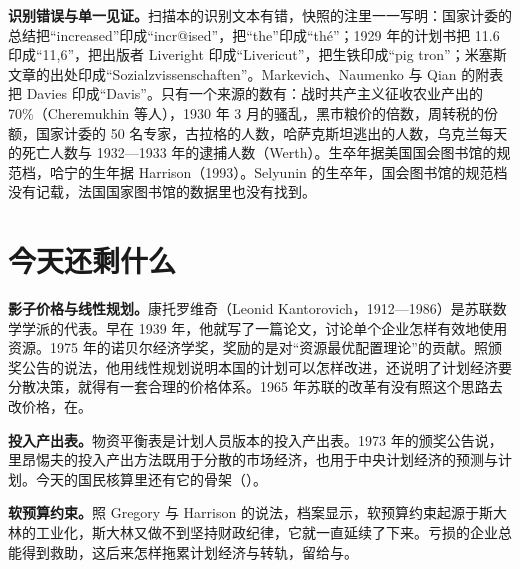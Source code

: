 \begin{deeper}[史料说明]
\textbf{识别错误与单一见证。}扫描本的识别文本有错，快照的注里一一写明：国家计委的总结把“increased”印成“incr@ised”，把“the”印成“thé”；1929 年的计划书把 11.6 印成“11,6”，把出版者 Liveright 印成“Livericut”，把生铁印成“pig tron”；米塞斯文章的出处印成“Sozialzvissenschaften”。Markevich、Naumenko 与 Qian 的附表把 Davies 印成“Davis”。只有一个来源的数有：战时共产主义征收农业产出的 70\%（Cheremukhin 等人），1930 年 3 月的骚乱，黑市粮价的倍数，周转税的份额，国家计委的 50 名专家，古拉格的人数，哈萨克斯坦逃出的人数，乌克兰每天的死亡人数与 1932—1933 年的逮捕人数（Werth）。生卒年据美国国会图书馆的规范档，哈宁的生年据 Harrison（1993）。Selyunin 的生卒年，国会图书馆的规范档没有记载，法国国家图书馆的数据里也没有找到。
\end{deeper}

\section{今天还剩什么}\label{sec:soviet-legacy}

\textbf{影子价格与线性规划。}康托罗维奇（Leonid Kantorovich，1912—1986）是苏联数学学派的代表\cite{nobel1975,loc31}。早在 1939 年，他就写了一篇论文，讨论单个企业怎样有效地使用资源\cite{nobel1975}。1975 年的诺贝尔经济学奖，奖励的是对“资源最优配置理论”的贡献\cite{nobel1975}。照颁奖公告的说法，他用线性规划说明本国的计划可以怎样改进，还说明了计划经济要分散决策，就得有一套合理的价格体系\cite{nobel1975}。1965 年苏联的改革有没有照这个思路去改价格，在。

\textbf{投入产出表。}物资平衡表是计划人员版本的投入产出表。1973 年的颁奖公告说，里昂惕夫的投入产出方法既用于分散的市场经济，也用于中央计划经济的预测与计划\cite{nobel1973}。今天的国民核算里还有它的骨架（）。

\textbf{软预算约束。}照 Gregory 与 Harrison 的说法，档案显示，软预算约束起源于斯大林的工业化，斯大林又做不到坚持财政纪律，它就一直延续了下来\cite{gregory2005}。亏损的企业总能得到救助，这后来怎样拖累计划经济与转轨，留给与。

